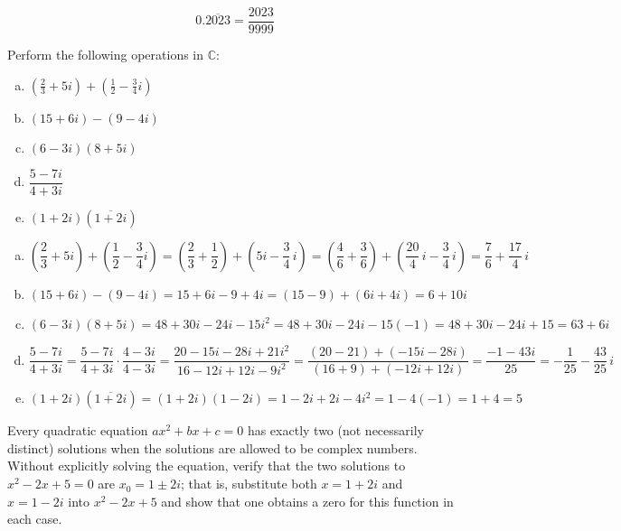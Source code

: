 \documentclass[11pt,letterpaper]{article}
\begin{document}
	\[
	0.\overline{2023}= \dfrac{2023}{9999}
	\]



\newpage



 Perform the following operations in $\mathbb{C}$:
	\begin{enumerate}[(a)]
	\item $(\frac{2}{3} + 5i) + (\frac{1}{2} - \frac{3}{4} i)$
	\item $(15 + 6i) - (9 - 4i)$
	\item $(6 - 3i)(8 + 5i)$
	\item $\dfrac{5 - 7i}{4 + 3i}$
	\item $(1 + 2i) (\overline{1 + 2i})$
	\end{enumerate} \pspace

\sol 
\begin{enumerate}[(a)]
\item 
	\[
	\left(\frac{2}{3} + 5i \right) + \left(\frac{1}{2} - \frac{3}{4} i \right)= \left( \dfrac{2}{3} + \dfrac{1}{2} \right) + \left( 5i - \dfrac{3}{4} \,i \right)= \left( \dfrac{4}{6} + \dfrac{3}{6} \right) + \left( \dfrac{20}{4}\,i - \dfrac{3}{4} \,i \right)= \dfrac{7}{6} + \dfrac{17}{4}\,i
	\] \pspace

\item 
	\[
	(15 + 6i) - (9 - 4i)= 15 + 6i - 9 + 4i= (15 - 9) + (6i + 4i)= 6 + 10i
	\] \pspace

\item 
	\[
	(6 - 3i)(8 + 5i)= 48 + 30i - 24i - 15 i^2= 48 + 30i - 24i - 15(-1)= 48 + 30i - 24i + 15= 63 + 6i
	\] \pspace

\item 
	\[
	\dfrac{5 - 7i}{4 + 3i}= \dfrac{5 - 7i}{4 + 3i} \cdot \dfrac{4 - 3i}{4 - 3i}= \dfrac{20 - 15i - 28i + 21i^2}{16 - 12i + 12i - 9i^2}= \dfrac{(20 - 21) + (-15i - 28i)}{(16 + 9) + (-12i + 12i)}= \dfrac{-1 - 43i}{25}= -\frac{1}{25} - \frac{43}{25}\,i
	\] \pspace

\item 
	\[
	(1 + 2i) (\overline{1 + 2i})= (1 + 2i)(1 - 2i)= 1 - 2i + 2i - 4i^2= 1 - 4(-1)= 1 + 4= 5
	\]
\end{enumerate}



\newpage



 Every quadratic equation $ax^2 + bx + c= 0$ has exactly two (not necessarily distinct) solutions when the solutions are allowed to be complex numbers. Without explicitly solving the equation, verify that the two solutions to $x^2 - 2x + 5= 0$ are $x_0= 1 \pm 2i$; that is, substitute both $x= 1 + 2i$ and $x= 1 - 2i$ into $x^2 - 2x + 5$ and show that one obtains a zero for this function in each case. \pspace
\end{document}
